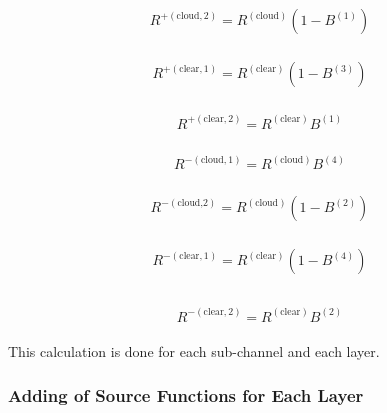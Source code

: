 \begin{eqnarray}
\begin{array}{l}
R^{+(\text {cloud}, 2)}=R^{(\text {cloud})}\left(1-B^{(1)}\right)
\end{array}
\end{eqnarray}

\begin{eqnarray}
\begin{array}{l}
R^{+(\text {clear}, 1)}=R^{(\text {clear})}\left(1-B^{(3)}\right)
\end{array}
\end{eqnarray}

\begin{eqnarray}
\begin{array}{l}
R^{+(\text {clear}, 2)}=R^{(\text {clear})} B^{(1)}
\end{array}
\end{eqnarray}

\begin{eqnarray}
\begin{array}{l}
R^{-(\text {cloud}, 1)}=R^{(\text {cloud})} B^{(4)}
\end{array}
\end{eqnarray}

\begin{eqnarray}
\begin{array}{l}
R^{-(\text {cloud,2})}=R^{(\text {cloud})}\left(1-B^{(2)}\right)
\end{array}
\end{eqnarray}

\begin{eqnarray}
\begin{array}{l}
R^{-(\text {clear}, 1)}=R^{(\text {clear})}\left(1-B^{(4)}\right) \\
\end{array}
\end{eqnarray}

\begin{eqnarray}
\begin{array}{l}
R^{-(\text {clear}, 2)}=R^{(\text {clear})} B^{(2)}
\end{array}
\end{eqnarray}

This calculation is done for each sub-channel and each layer.

\hypertarget{adding-of-source-functions-for-each-layer}{%
\subsubsection{Adding of Source Functions for Each Layer}\label{adding-of-source-functions-for-each-layer}}

